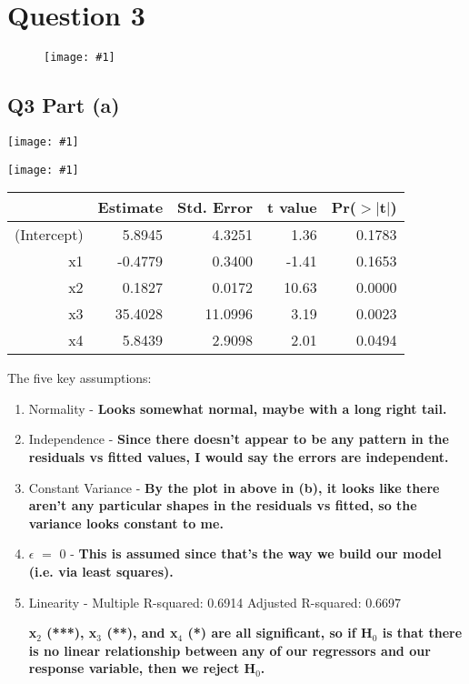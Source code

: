 \documentclass{article}
\newcommand{\mt}[1]{\ensuremath{#1}}
\newcommand\bsc[2][\DefaultOpt]{%
  \def\DefaultOpt{#2}%
  \section[#1]{#2}%
}
\newcommand\ssc[2][\DefaultOpt]{%
  \def\DefaultOpt{#2}%
  \subsection[#1]{#2}%
}
\newcommand{\balist}{\begin{enumerate}[label=\alph*.]}
\newcommand{\elist}{\end{enumerate}}
\newcommand{\eql}{ \mt{\operatorname{=}} }
\newcommand{\uw}[2]{#1\mt{_{#2}}}
\newcommand{\txt}[1]{\text{#1}} %
\newcommand{\exv}[1]{\txt{E[}#1\txt{]}}
\newcommand{\simg}[1]{
  \texttt{[image: \#1]}
}
\newcommand{\wimg}[1]{
\begin{figure}[h]
  \texttt{[image: \#1]}
\end{figure}
}
\newcommand\tab[1][1cm]{\hspace*{#1}}
\begin{document}
\bsc{Question 3}{
\wimg{HW6Q3}

\ssc{Q3 Part (a)}{

\simg{HW6Q3PAHist}
\simg{HW6Q3PARes}

\begin{table}[ht]
\centering
\begin{tabular}{rrrrr}
  \hline
 & Estimate & Std. Error & t value & Pr($>$$|$t$|$) \\ 
  \hline
(Intercept) & 5.8945 & 4.3251 & 1.36 & 0.1783 \\ 
  x1 & -0.4779 & 0.3400 & -1.41 & 0.1653 \\ 
  x2 & 0.1827 & 0.0172 & 10.63 & 0.0000 \\ 
  x3 & 35.4028 & 11.0996 & 3.19 & 0.0023 \\ 
  x4 & 5.8439 & 2.9098 & 2.01 & 0.0494 \\ 
   \hline
\end{tabular}
\end{table}
The five key assumptions:

\balist
\item Normality - \textbf{Looks somewhat normal, maybe with a long right tail.}

\item Independence - \textbf{Since there doesn't appear to be any pattern in the residuals vs fitted values, I would say the errors are independent.}

\item Constant Variance - \textbf{By the plot in above in (b), it looks like there aren't any particular shapes in the residuals vs fitted, so the variance looks constant to me.}

\item \exv{$\epsilon$} \eql 0 - \textbf{This is assumed since that's the way we build our model (i.e. via least squares).}

\item Linearity - Multiple R-squared:  0.6914 \tab 	Adjusted R-squared:  0.6697

\textbf{\uw{x}{2} (***), \uw{x}{3} (**), and \uw{x}{4} (*) are all significant, so if \uw{H}{0} is that there is no linear relationship between any of our regressors and our response variable, then we reject \uw{H}{0}.}

\elist

}
}

\newpage
\end{document}
